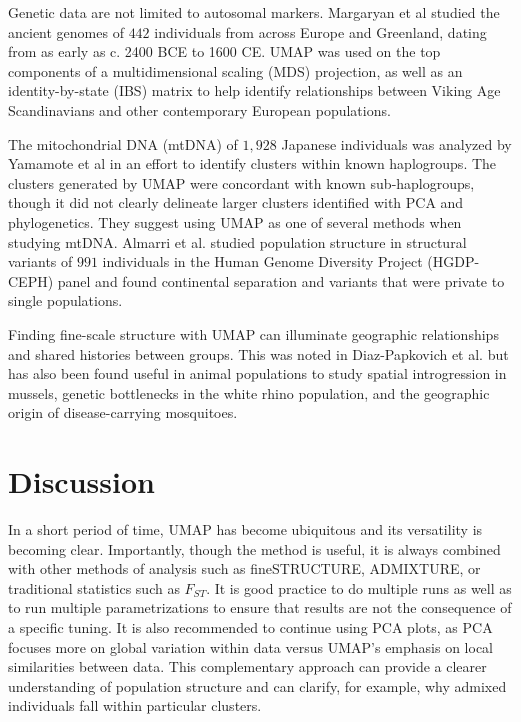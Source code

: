 \documentclass[12pt]{article}
\begin{document}
Genetic data are not limited to autosomal markers. Margaryan et al\cite{margaryan_population_2019} studied the ancient genomes of $442$ individuals from across Europe and Greenland, dating from as early as c. 2400 BCE to 1600 CE. UMAP was used on the top components of a multidimensional scaling (MDS) projection, as well as an identity-by-state (IBS) matrix to help identify relationships between Viking Age Scandinavians and other contemporary European populations. 

The mitochondrial DNA (mtDNA) of $1,928$ Japanese individuals was analyzed by Yamamote et al in an effort to identify clusters within known haplogroups\cite{yamamoto_genetic_2020}. The clusters generated by UMAP were concordant with known sub-haplogroups, though it did not clearly delineate larger clusters identified with PCA and phylogenetics. They suggest using UMAP as one of several methods when studying mtDNA. Almarri et al.\cite{almarri_population_2020} studied population structure in structural variants of $991$ individuals in the Human Genome Diversity Project (HGDP-CEPH) panel and found continental separation and variants that were private to single populations.

Finding fine-scale structure with UMAP can illuminate geographic relationships and shared histories between groups. This was noted in Diaz-Papkovich et al.\cite{diaz-papkovich_umap_2019} but has also been found useful in animal populations to study spatial introgression in mussels\cite{simon_local_2019}, genetic bottlenecks in the white rhino population\cite{sanchez-barreiro_historical_2020}, and the geographic origin of disease-carrying mosquitoes\cite{consortium_genome_2020}\cite{schmidt_population_2020}.

\section*{Discussion}
In a short period of time, UMAP has become ubiquitous and its versatility is becoming clear. Importantly, though the method is useful, it is always combined with other methods of analysis such as fineSTRUCTURE\cite{lawson2012inference}, ADMIXTURE\cite{alexander2009fast}, or traditional statistics such as $F_{ST}$. It is good practice to do multiple runs as well as to run multiple parametrizations to ensure that results are not the consequence of a specific tuning. It is also recommended to continue using PCA plots, as PCA focuses more on global variation within data versus UMAP's emphasis on local similarities between data. This complementary approach can provide a clearer understanding of population structure and can clarify, for example, why admixed individuals fall within particular clusters.
\end{document}
